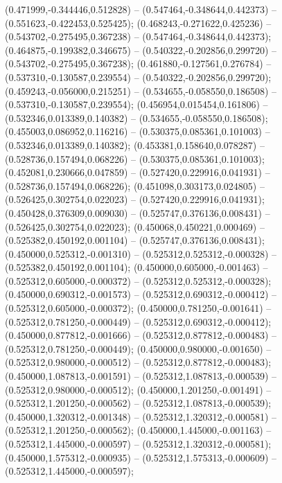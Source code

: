  (0.471999,-0.344446,0.512828) -- (0.547464,-0.348644,0.442373) -- (0.551623,-0.422453,0.525425);
 (0.468243,-0.271622,0.425236) -- (0.543702,-0.275495,0.367238) -- (0.547464,-0.348644,0.442373);
 (0.464875,-0.199382,0.346675) -- (0.540322,-0.202856,0.299720) -- (0.543702,-0.275495,0.367238);
 (0.461880,-0.127561,0.276784) -- (0.537310,-0.130587,0.239554) -- (0.540322,-0.202856,0.299720);
 (0.459243,-0.056000,0.215251) -- (0.534655,-0.058550,0.186508) -- (0.537310,-0.130587,0.239554);
 (0.456954,0.015454,0.161806) -- (0.532346,0.013389,0.140382) -- (0.534655,-0.058550,0.186508);
 (0.455003,0.086952,0.116216) -- (0.530375,0.085361,0.101003) -- (0.532346,0.013389,0.140382);
 (0.453381,0.158640,0.078287) -- (0.528736,0.157494,0.068226) -- (0.530375,0.085361,0.101003);
 (0.452081,0.230666,0.047859) -- (0.527420,0.229916,0.041931) -- (0.528736,0.157494,0.068226);
 (0.451098,0.303173,0.024805) -- (0.526425,0.302754,0.022023) -- (0.527420,0.229916,0.041931);
 (0.450428,0.376309,0.009030) -- (0.525747,0.376136,0.008431) -- (0.526425,0.302754,0.022023);
 (0.450068,0.450221,0.000469) -- (0.525382,0.450192,0.001104) -- (0.525747,0.376136,0.008431);
 (0.450000,0.525312,-0.001310) -- (0.525312,0.525312,-0.000328) -- (0.525382,0.450192,0.001104);
 (0.450000,0.605000,-0.001463) -- (0.525312,0.605000,-0.000372) -- (0.525312,0.525312,-0.000328);
 (0.450000,0.690312,-0.001573) -- (0.525312,0.690312,-0.000412) -- (0.525312,0.605000,-0.000372);
 (0.450000,0.781250,-0.001641) -- (0.525312,0.781250,-0.000449) -- (0.525312,0.690312,-0.000412);
 (0.450000,0.877812,-0.001666) -- (0.525312,0.877812,-0.000483) -- (0.525312,0.781250,-0.000449);
 (0.450000,0.980000,-0.001650) -- (0.525312,0.980000,-0.000512) -- (0.525312,0.877812,-0.000483);
 (0.450000,1.087813,-0.001591) -- (0.525312,1.087813,-0.000539) -- (0.525312,0.980000,-0.000512);
 (0.450000,1.201250,-0.001491) -- (0.525312,1.201250,-0.000562) -- (0.525312,1.087813,-0.000539);
 (0.450000,1.320312,-0.001348) -- (0.525312,1.320312,-0.000581) -- (0.525312,1.201250,-0.000562);
 (0.450000,1.445000,-0.001163) -- (0.525312,1.445000,-0.000597) -- (0.525312,1.320312,-0.000581);
 (0.450000,1.575312,-0.000935) -- (0.525312,1.575313,-0.000609) -- (0.525312,1.445000,-0.000597);
